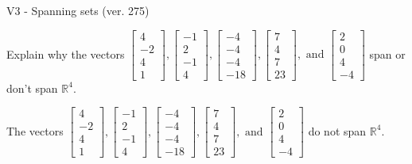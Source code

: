 \begin{exercise}
  \begin{exerciseTitle}V3 - Spanning sets (ver. 275)\end{exerciseTitle}
  \begin{exerciseStatement}
    Explain why the vectors \(\left[\begin{array}{r}
4 \\
-2 \\
4 \\
1
\end{array}\right] , \left[\begin{array}{r}
-1 \\
2 \\
-1 \\
4
\end{array}\right] , \left[\begin{array}{r}
-4 \\
-4 \\
-4 \\
-18
\end{array}\right] , \left[\begin{array}{r}
7 \\
4 \\
7 \\
23
\end{array}\right] , \text{ and } \left[\begin{array}{r}
2 \\
0 \\
4 \\
-4
\end{array}\right]\) span or don't span \(\mathbb{R}^4\). 
	


  \end{exerciseStatement}
  \begin{exerciseAnswer}
   The vectors \(\left[\begin{array}{r}
4 \\
-2 \\
4 \\
1
\end{array}\right] , \left[\begin{array}{r}
-1 \\
2 \\
-1 \\
4
\end{array}\right] , \left[\begin{array}{r}
-4 \\
-4 \\
-4 \\
-18
\end{array}\right] , \left[\begin{array}{r}
7 \\
4 \\
7 \\
23
\end{array}\right] , \text{ and } \left[\begin{array}{r}
2 \\
0 \\
4 \\
-4
\end{array}\right]\) 
  	 do not  
	span \(\mathbb{R}^4\).
  



\end{exerciseAnswer}
\end{exercise}
